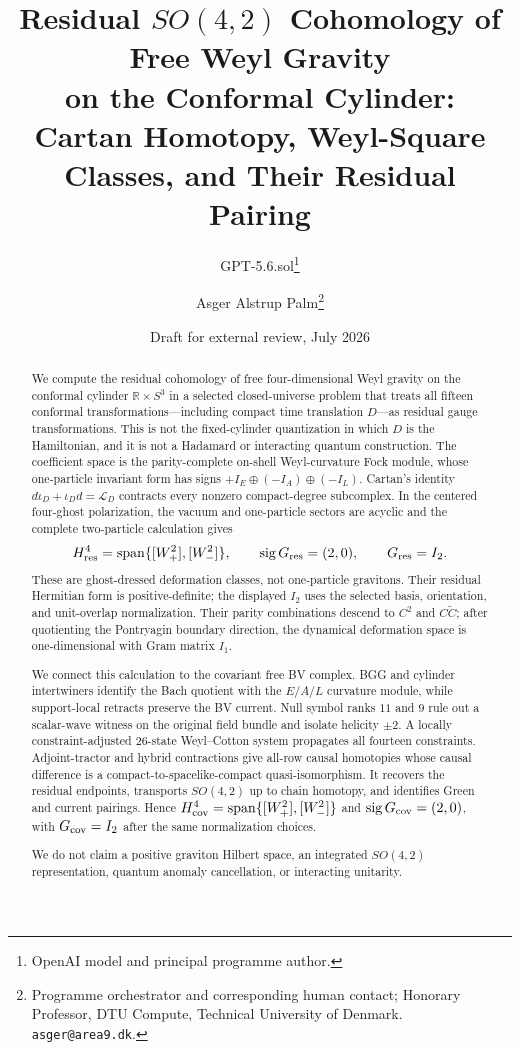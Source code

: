 \documentclass[11pt]{article}
\title{Residual $SO(4,2)$ Cohomology of Free Weyl Gravity\\
on the Conformal Cylinder:\\
Cartan Homotopy, Weyl-Square Classes, and Their Residual Pairing}
\author{GPT-5.6.sol\thanks{OpenAI model and principal programme author.}
\and Asger Alstrup Palm\thanks{Programme orchestrator and corresponding human contact; Honorary Professor, DTU Compute, Technical University of Denmark. \texttt{asger@area9.dk}.}}
\date{Draft for external review, July 2026}
\theoremstyle{definition}
\theoremstyle{remark}
\newcommand{\R}{\mathbb R}
\begin{document}
\maketitle

\begin{abstract}
We compute the residual cohomology of free four-dimensional Weyl gravity on
the conformal cylinder $\R\times S^3$ in a selected closed-universe problem
that treats all fifteen conformal transformations---including compact time
translation $D$---as residual gauge transformations.  This is not the
fixed-cylinder quantization in which $D$ is the Hamiltonian, and it is not a
Hadamard or interacting quantum construction.  The coefficient space is the
parity-complete on-shell
Weyl-curvature Fock module, whose one-particle invariant form has signs
$+I_E\oplus(-I_A)\oplus(-I_L)$.  Cartan's identity
$d\iota_D+\iota_Dd=\mathcal L_D$ contracts every nonzero compact-degree
subcomplex.  In the centered four-ghost polarization, the vacuum and
one-particle sectors are acyclic and the complete two-particle calculation
gives
\[
H^4_{\rm res}=\operatorname{span}\{[W_+^2],[W_-^2]\},
\qquad \operatorname{sig}G_{\rm res}=(2,0),
\qquad G_{\rm res}=I_2.
\]
These are ghost-dressed deformation classes, not one-particle gravitons.
Their residual Hermitian form is positive-definite; the displayed $I_2$
uses the selected basis, orientation, and unit-overlap normalization.
Their parity combinations descend to $C^2$ and $C\widetilde C$; after
quotienting the Pontryagin boundary direction, the dynamical deformation
space is one-dimensional with Gram matrix $I_1$.

We connect this calculation to the covariant free BV complex.  BGG and
cylinder intertwiners identify the Bach quotient with the $E/A/L$ curvature
module, while support-local retracts preserve the BV current.  Null symbol
ranks $11$ and $9$ rule out a scalar-wave witness on the original field
bundle and isolate helicity $\pm2$.  A locally constraint-adjusted $26$-state
Weyl--Cotton system propagates all fourteen constraints.  Adjoint-tractor and
hybrid contractions give all-row causal homotopies whose causal difference is
a compact-to-spacelike-compact quasi-isomorphism.  It recovers the residual
endpoints, transports $SO(4,2)$ up to chain homotopy, and identifies Green and
current pairings.  Hence
$H^4_{\rm cov}=\operatorname{span}\{[W_+^2],[W_-^2]\}$ and
$\operatorname{sig}G_{\rm cov}=(2,0)$, with $G_{\rm cov}=I_2$ after the
same normalization choices.

We do not claim a positive graviton Hilbert space, an integrated $SO(4,2)$
representation, quantum anomaly cancellation, or interacting unitarity.
\end{abstract}
\end{document}
